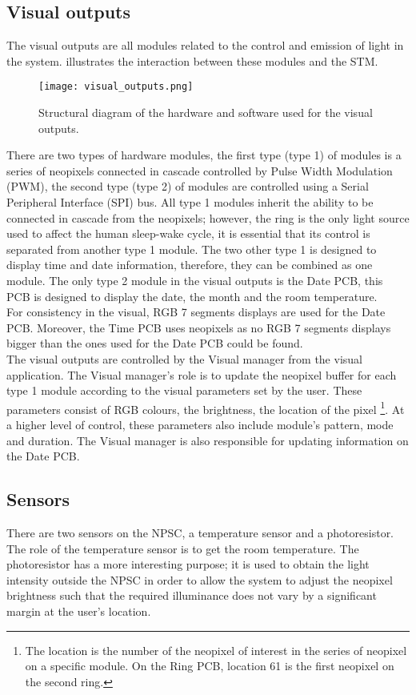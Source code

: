 \subsection{Visual outputs}
The visual outputs are all modules related to the control and emission of light in the system.  illustrates the interaction between these modules and the STM. 
\begin{figure}[ht]
\centering
\texttt{[image: visual\_outputs.png]}
\caption{Structural diagram of the hardware and software used for the visual outputs.}
\label{fig:visual_outputs}
\end{figure}
There are two types of hardware modules, the first type (type 1) of modules is a series of neopixels connected in cascade controlled by Pulse Width Modulation (PWM), the second type (type 2) of modules are controlled using a Serial Peripheral Interface (SPI) bus. All type 1 modules inherit the ability to be connected in cascade from the neopixels; however, the ring is the only light source used to affect the human sleep-wake cycle, it is essential that its control is separated from another type 1 module. The two other type 1 is designed to display time and date information, therefore, they can be combined as one module. The only type 2 module in the visual outputs is the Date PCB, this PCB is designed to display the date, the month and the room temperature.\\
For consistency in the visual, RGB 7 segments displays are used for the Date PCB. Moreover, the Time PCB uses neopixels as no RGB 7 segments displays bigger than the ones used for the Date PCB could be found.\\
The visual outputs are controlled by the Visual manager from the visual application. The Visual manager's role is to update the neopixel buffer for each type 1 module according to the visual parameters set by the user. These parameters consist of RGB colours, the brightness, the location of the pixel \footnote{The location is the number of the neopixel of interest in the series of neopixel on a specific module. On the Ring PCB, location 61 is the first neopixel on the second ring.}. At a higher level of control, these parameters also include module's pattern, mode and duration. The Visual manager is also responsible for updating information on the Date PCB.   

\subsection{Sensors}
There are two sensors on the NPSC, a temperature sensor and a photoresistor. The role of the temperature sensor is to get the room temperature. The photoresistor has a more interesting purpose; it is used to obtain the light intensity outside the NPSC in order to allow the system to adjust the neopixel brightness such that the required illuminance does not vary by a significant margin at the user's location.




